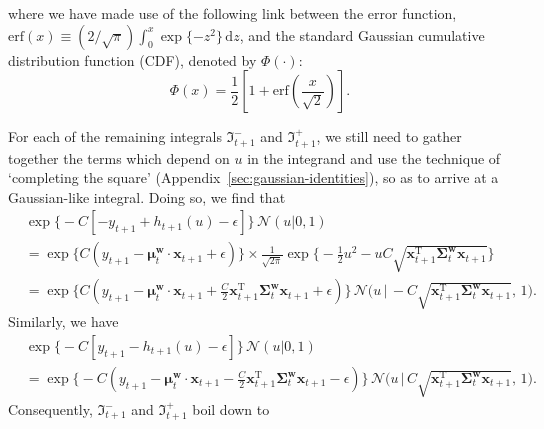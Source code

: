 where we have made use of the following link between the error function, $\mathrm{erf}(x) \equiv (2/\sqrt{\pi}) \int_{0}^{x} \exp\{-z^2\}\,\mathrm{d}z$, and the standard Gaussian cumulative distribution function (CDF), denoted by $\Phi(\cdot)$:
\begin{equation}
	\Phi(x) = \frac{1}{2}\left[1 + \mathrm{erf}\left(\frac{x}{\sqrt{2}}\right)\right].
\end{equation}

For each of the remaining integrals $\mathfrak{I}_{t+1}^-$ and $\mathfrak{I}_{t+1}^+$, we still need to gather together the terms which depend on $u$ in the integrand and use the technique of `completing the square' (Appendix~\ref{sec:gaussian-identities}), so as to arrive at a Gaussian-like integral. Doing so, we find that
\begin{align}
	& \exp\Big\{-C[-y_{t+1} + h_{t+1}(u) - \epsilon]\Big\}\,\mathcal{N}(u|0, 1)
	\nonumber \\
	&= \exp\Big\{C(y_{t+1} - \boldsymbol{\mu}_{t}^\mathbf{w}\cdot\mathbf{x}_{t+1} + \epsilon)\Big\}
	\times \frac{1}{\sqrt{2\pi}}\exp\Big\{-\frac{1}{2}u^2 - uC\sqrt{\mathbf{x}_{t+1}^\text{T}\boldsymbol{\Sigma}_{t}^\mathbf{w}\mathbf{x}_{t+1}}\Big\}
	\nonumber \\
	&= \exp\Big\{C\left(y_{t+1} - \boldsymbol{\mu}_{t}^\mathbf{w}\cdot\mathbf{x}_{t+1} + \frac{C}{2}\mathbf{x}_{t+1}^\text{T}\boldsymbol{\Sigma}_{t}^\mathbf{w}\mathbf{x}_{t+1} + \epsilon\right)\Big\}\,
	\mathcal{N}\big(u \, \big| \, -C\sqrt{\mathbf{x}_{t+1}^\text{T}\boldsymbol{\Sigma}_{t}^\mathbf{w}\mathbf{x}_{t+1}},\, 1\big).
\end{align}
Similarly, we have
\begin{align}
	& \exp\Big\{-C[y_{t+1} - h_{t+1}(u) - \epsilon]\Big\}\,\mathcal{N}(u|0, 1)
	\nonumber \\	
	&= \exp\Big\{-C\left(y_{t+1} - \boldsymbol{\mu}_{t}^\mathbf{w}\cdot\mathbf{x}_{t+1} - \frac{C}{2}\mathbf{x}_{t+1}^\text{T}\boldsymbol{\Sigma}_{t}^\mathbf{w}\mathbf{x}_{t+1} - \epsilon\right)\Big\}\,\mathcal{N}\big(u \, \big| \, C\sqrt{\mathbf{x}_{t+1}^\text{T}\boldsymbol{\Sigma}_{t}^\mathbf{w}\mathbf{x}_{t+1}},\, 1\big).
\end{align}
Consequently, $\mathfrak{I}_{t+1}^-$ and $\mathfrak{I}_{t+1}^+$ boil down to

